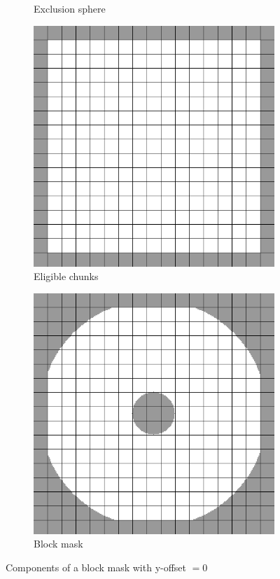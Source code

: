 \documentclass[12pt]{article}
\begin{document}
\begin{figure}[H]
\begin{subfigure}{0.25\textwidth}
\caption{Exclusion sphere}
\label{fig:exclusion-sphere}
\end{subfigure}%
\begin{subfigure}{0.25\textwidth}
\includegraphics[width=.9\linewidth]{eligible-chunks.png}
\caption{Eligible chunks}
\label{fig:eligible-chunks}
\end{subfigure}%
\begin{subfigure}{0.25\textwidth}
\includegraphics[width=.9\linewidth]{block-mask.png}
\caption{Block mask}
\label{fig:block-mask}
\end{subfigure}
\caption{Components of a block mask with y-offset $= 0$}
\label{fig:block-mask-components}
\end{figure}
\end{document}
